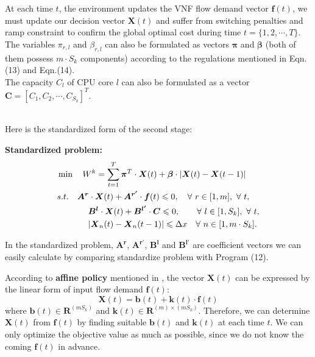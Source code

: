 \documentclass{acmtog}
\begin{document}
At each time $t$, the environment updates the VNF flow demand vector $\bm{f}(t)$, we must update our decision vector $\bm{X}(t)$ and suffer from switching penalties and ramp constraint to confirm the global optimal cost during time $t=\{1,2,\cdots,T\}$.
\\\indent The variables $\pi_{r,l}$ and $\beta_{r,l}$ can also be formulated as vectors $\bm{\pi}$ and $\bm{\beta}$ (both of them possess $m\cdot S_k$ components) according to the regulations mentioned in Eqn.(13) and Eqn.(14). 
\\\indent The capacity $C_l$ of CPU core $l$ can also be formulated as a vector $\bm{C}=[C_1,C_2,\cdots,C_{S_k}]^T$.

\\\indent Here is the standardized form of the second stage:

{\noindent \bf Standardized problem: }\\
\begin{subequations}
\begin{align}
&\min \quad W^k=\sum_{t=1}^{T} \bm{\pi}^T \cdot \bm{X}(t)+\bm{\beta} \cdot|\bm{X}(t)-\bm{X}(t-1)| \\
& s.t. \quad \bm{A^r}\cdot\bm{X}(t)+\bm{A^{r'}}\cdot\bm{f}(t) \leqslant 0,\quad\forall ~r\in[1,m],~\forall~t,\\
& \indent\indent~~\bm{B^l}\cdot \bm{X}(t)+ \bm{B^{l'}}\cdot \bm{C} \leqslant 0,~~~\quad \forall~l\in [1,S_k],~\forall~t,\\
& \indent\indent~~|\bm{X}_n(t)-\bm{X}_n(t-1)| \leqslant \Delta x\quad \forall ~n\in [1,m\cdot S_k].
\end{align}
\end{subequations}


In the standardized problem, $\bm{A^r}$, $\bm{A^{r'}}$, $\bm{B^l}$ and $\bm{B^{l'}}$ are coefficient vectors we can easily calculate by comparing standardize problem with Program (12).

According to \textbf{affine policy} mentioned in \cite{c9}, the vector $\bm{X}(t)$ can be expressed by the linear form of input flow demand $\bm{f}(t)$:
\begin{equation}
  \bm{X}(t)=\bm{b}(t)+\bm{k}(t)\cdot \bm{f}(t)
\end{equation}
where $\bm{b}(t)\in \bm{R}^{(mS_k)}$ and $\bm{k}(t)\in \bm{R}^{(m)\times(mS_k)}$.
Therefore, we can determine $\bm{X}(t)$ from $\bm{f}(t)$ by finding suitable $\bm{b}(t)$ and $\bm{k}(t)$ at each time $t$. We can only optimize the objective value as much as possible, since we do not know the coming $\bm{f}(t)$ in advance.
\end{document}
